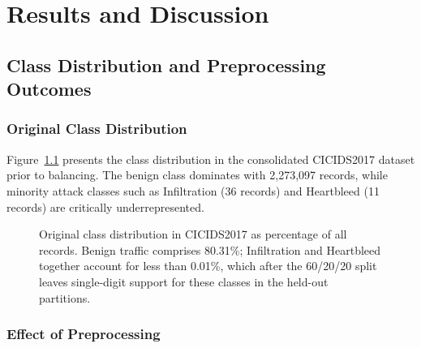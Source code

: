 \chapter{Results and Discussion}
\label{chap:results}
\setlength{\parskip}{0.8em}

\section{Class Distribution and Preprocessing Outcomes}

\subsection{Original Class Distribution}

Figure~\ref{fig:class_dist} presents the class distribution in the consolidated CICIDS2017 dataset prior to balancing. The benign class dominates with 2{,}273{,}097 records, while minority attack classes such as Infiltration (36 records) and Heartbleed (11 records) are critically underrepresented.

\begin{figure}[H]
\centering
{}
\caption{Original class distribution in CICIDS2017 as percentage of all records. Benign traffic comprises 80.31\%; Infiltration and Heartbleed together account for less than 0.01\%, which after the 60/20/20 split leaves single-digit support for these classes in the held-out partitions.}
\label{fig:class_dist}
\end{figure}

\subsection{Effect of Preprocessing}

